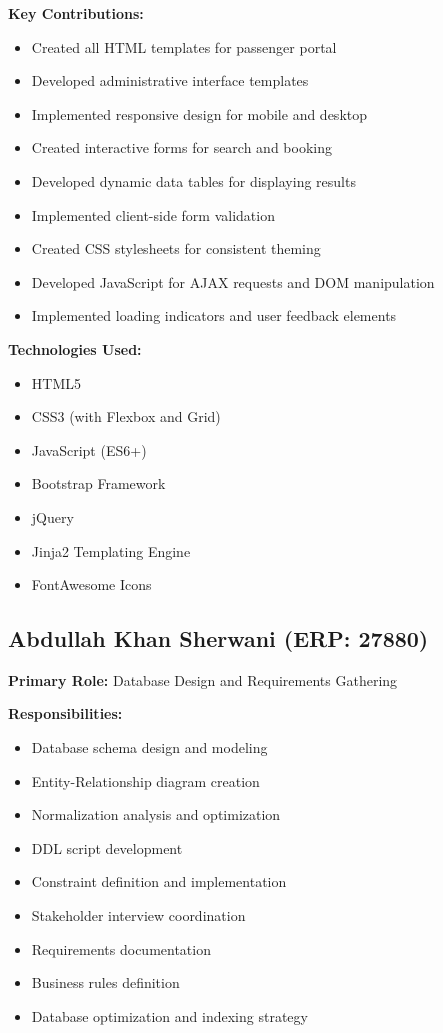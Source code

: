 \documentclass[12pt,a4paper,openany]{report}
\begin{document}
\textbf{Key Contributions:}
\begin{itemize}
    \item Created all HTML templates for passenger portal
    \item Developed administrative interface templates
    \item Implemented responsive design for mobile and desktop
    \item Created interactive forms for search and booking
    \item Developed dynamic data tables for displaying results
    \item Implemented client-side form validation
    \item Created CSS stylesheets for consistent theming
    \item Developed JavaScript for AJAX requests and DOM manipulation
    \item Implemented loading indicators and user feedback elements
\end{itemize}

\textbf{Technologies Used:}
\begin{itemize}
    \item HTML5
    \item CSS3 (with Flexbox and Grid)
    \item JavaScript (ES6+)
    \item Bootstrap Framework
    \item jQuery
    \item Jinja2 Templating Engine
    \item FontAwesome Icons
\end{itemize}

\subsection{Abdullah Khan Sherwani (ERP: 27880)}

\textbf{Primary Role:} Database Design and Requirements Gathering

\textbf{Responsibilities:}
\begin{itemize}
    \item Database schema design and modeling
    \item Entity-Relationship diagram creation
    \item Normalization analysis and optimization
    \item DDL script development
    \item Constraint definition and implementation
    \item Stakeholder interview coordination
    \item Requirements documentation
    \item Business rules definition
    \item Database optimization and indexing strategy
\end{itemize}
\end{document}
